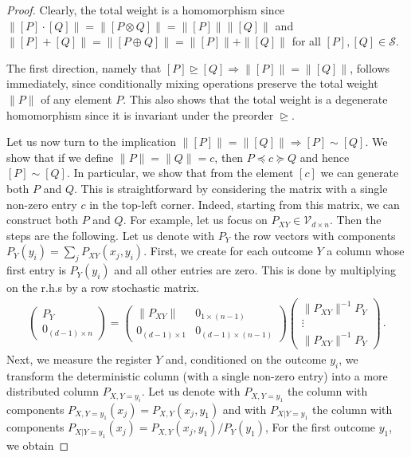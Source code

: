 \documentclass[aps,pra,11pt,onecolumn,nofootinbib,tightenlines]{revtex4-2}
\theoremstyle{definition}
\newcommand{\cS}{\mathcal{S}}
\newcommand{\V}{\mathcal{V}}
\newcommand{\rgeq}{\trianglerighteq}
\begin{document}
\begin{proof}
Clearly, the total weight is a homomorphism since $\|[P]\cdot [Q]\|=\|[P\otimes Q]\|=\|[P]\|\|[Q]\|$ and $\|[P]+[Q]\|=\|[P\oplus Q]\|=\|[P]\|+\|[Q]\|$ for all $[P],[Q]\in\cS$.

The first direction, namely that $[P] \rgeq [Q] \Rightarrow \|[P]\| = \|[Q]\|$, follows immediately, since conditionally mixing operations preserve the total weight $\|P\|$ of any element $P$. This also shows that the total weight is a degenerate homomorphism since it is invariant under the preorder $\rgeq$.

Let us now turn to the implication $\|[P]\|=\|[Q]\|\Rightarrow [P]\sim [Q]$.  We show that if we define $\|P\|=\|Q\| = c$, then $P\preceq c\succeq Q$
and hence $[P]\sim [Q]$. In particular, we show that from the element $[c]$ we can generate both $P$ and $Q$. This is straightforward by considering the matrix with a single non-zero entry $c$ in the top-left corner. Indeed, starting from this matrix, we can construct both $P$ and $Q$. For example, let us focus on $P_{XY} \in \V_{d\times n}$.
Then the steps are the following. Let us denote with $P_{Y}$ the row vectors with components $P_Y(y_i) = \sum_jP_{XY}(x_j,y_i)$.
First, we create for each outcome $Y$ a column whose first entry is $P_Y(y_i)$ and all other entries are zero. This is done by multiplying on the r.h.s by a row stochastic matrix.
\begin{align}
\begin{pmatrix}
     P_{Y} \\
    0_{(d-1) \times n}
\end{pmatrix}=
\begin{pmatrix}
    \|P_{XY}\| & 0_{1\times (n-1)} \\
    0_{(d-1)\times 1} & 0_{(d-1)\times (n-1)}
\end{pmatrix}
\begin{pmatrix}
    \|P_{XY}\|^{-1} P_{Y} \\
    \vdots \\
    \|P_{XY}\|^{-1} P_{Y}
\end{pmatrix}\,.
\end{align}
Next, we measure the register $Y$ and, conditioned on the outcome $y_i$, we transform the deterministic column (with a single non-zero entry) into a more distributed column $P_{X,Y=y_i}$. Let us denote with $P_{X,Y=y_1}$ the column with components $P_{X,Y=y_1}(x_j)=P_{X,Y}(x_j,y_1)$ and with $P_{X|Y=y_1}$ the column with components $P_{X|Y=y_1}(x_j)=P_{X,Y}(x_j,y_1)/P_Y(y_1)$,
For the first outcome $y_1$, we obtain

\end{proof}
\end{document}
